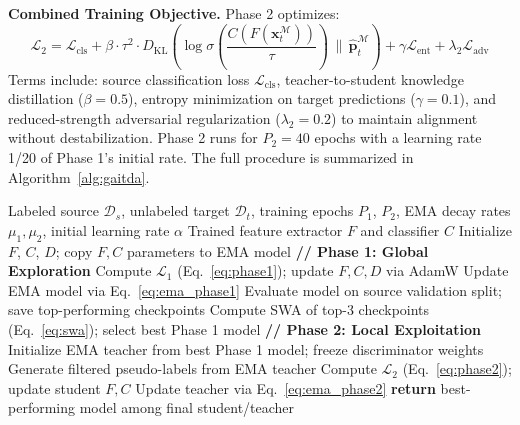 \documentclass[conference]{IEEEtran}
\begin{document}
\textbf{Combined Training Objective.} Phase 2 optimizes:
\begin{equation}
    \mathcal{L}_2 = \mathcal{L}_{\text{cls}} + \beta \cdot \tau^2 \cdot D_{\text{KL}}\!\left(\log \sigma\!\left(\frac{C(F(\mathbf{x}_t^{\mathcal{M}}))}{\tau}\right) \,\Big\|\, \hat{\mathbf{p}}_t^{\mathcal{M}}\right) + \gamma \mathcal{L}_{\text{ent}} + \lambda_2 \mathcal{L}_{\text{adv}}
\label{eq:phase2}
\end{equation}
Terms include: source classification loss $\mathcal{L}_{\text{cls}}$, teacher-to-student knowledge distillation ($\beta=0.5$), entropy minimization on target predictions ($\gamma=0.1$), and reduced-strength adversarial regularization ($\lambda_2=0.2$) to maintain alignment without destabilization. Phase 2 runs for $P_2=40$ epochs with a learning rate 1/20 of Phase 1’s initial rate. The full procedure is summarized in Algorithm~\ref{alg:gaitda}.

\begin{algorithm}[!t]
\caption{Two-Phase Stabilized Adaptation Heuristic}
\label{alg:gaitda}
\begin{algorithmic}[1]
\REQUIRE Labeled source $\mathcal{D}_s$, unlabeled target $\mathcal{D}_t$, training epochs $P_1$, $P_2$, EMA decay rates $\mu_1, \mu_2$, initial learning rate $\alpha$
\ENSURE Trained feature extractor $F$ and classifier $C$
\STATE Initialize $F$, $C$, $D$; copy $F,C$ parameters to EMA model
\STATE \textbf{// Phase 1: Global Exploration}
        \STATE Compute $\mathcal{L}_1$ (Eq.~\ref{eq:phase1}); update $F, C, D$ via AdamW
        \STATE Update EMA model via Eq.~\ref{eq:ema_phase1} 
    \ENDFOR
    \STATE Evaluate model on source validation split; save top-performing checkpoints
\ENDFOR
\STATE Compute SWA of top-3 checkpoints (Eq.~\ref{eq:swa}); select best Phase 1 model
\STATE \textbf{// Phase 2: Local Exploitation}
\STATE Initialize EMA teacher from best Phase 1 model; freeze discriminator weights
        \STATE Generate filtered pseudo-labels from EMA teacher
        \STATE Compute $\mathcal{L}_2$ (Eq.~\ref{eq:phase2}); update student $F, C$
        \STATE Update teacher via Eq.~\ref{eq:ema_phase2}
    \ENDFOR
\ENDFOR
\STATE \textbf{return} best-performing model among final student/teacher
\end{algorithmic}
\end{algorithm}
\end{document}
